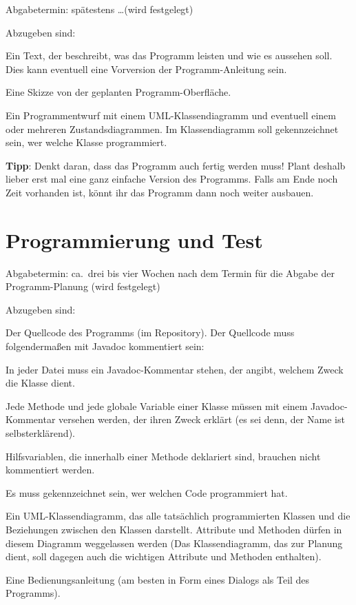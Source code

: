 Abgabetermin:       spätestens \ldots (wird festgelegt)

Abzugeben sind:

\begin{compactitem}
\item Ein Text, der beschreibt, was das Programm leisten und wie es aussehen
soll. Dies kann eventuell eine Vorversion der Programm-Anleitung sein.

\item Eine Skizze von der geplanten Programm-Oberfläche.

\item Ein Programmentwurf mit einem UML-Klassendiagramm und eventuell einem oder
mehreren Zustandsdiagrammen. Im Klassendiagramm soll gekennzeichnet sein, wer
welche Klasse programmiert.
\end{compactitem}

\textbf{Tipp}: Denkt daran, dass das Programm auch fertig werden muss! Plant
deshalb lieber erst mal eine ganz einfache Version des Programms. Falls am Ende
noch Zeit vorhanden ist, könnt ihr das Programm dann noch weiter ausbauen.


\section{Programmierung und Test}

Abgabetermin: ca.\ drei bis vier Wochen nach dem Termin für die Abgabe der
Programm-Planung (wird festgelegt)

Abzugeben sind:

\begin{compactitem}
\item Der Quellcode des Programms (im Repository). Der Quellcode muss
folgendermaßen mit Javadoc kommentiert sein:

\begin{compactitem}
\item In jeder Datei muss ein Javadoc-Kommentar stehen, der angibt, welchem
Zweck die Klasse dient.
\item Jede Methode und jede globale Variable einer Klasse müssen mit einem
Javadoc-Kommentar versehen werden, der ihren Zweck erklärt (es sei denn, der
Name ist selbsterklärend).
\item Hilfsvariablen, die innerhalb einer Methode deklariert sind, brauchen
nicht kommentiert werden.
\item Es muss gekennzeichnet sein, wer welchen Code programmiert hat.
\end{compactitem}

\item Ein UML-Klassendiagramm, das alle tatsächlich programmierten Klassen und
die Beziehungen zwischen den Klassen darstellt. Attribute und Methoden dürfen
in diesem Diagramm weggelassen werden (Das Klassendiagramm, das zur Planung
dient, soll dagegen auch die wichtigen Attribute und Methoden enthalten).

\item Eine Bedienungsanleitung (am besten in Form eines Dialogs als Teil des
Programms).

\end{compactitem}

